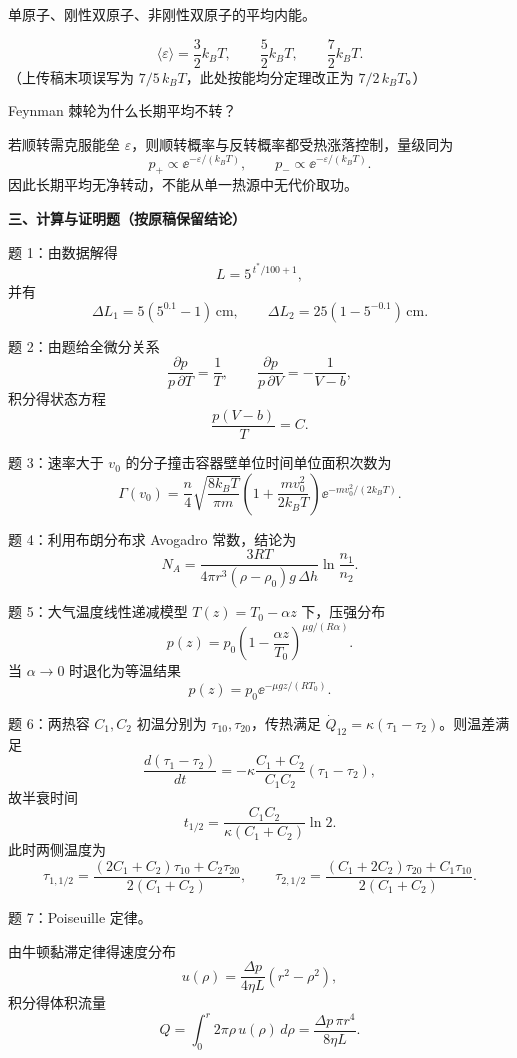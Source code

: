 \begin{question}
单原子、刚性双原子、非刚性双原子的平均内能。
\begin{solution}
\[
\langle \varepsilon\rangle=
\frac32k_BT,\qquad \frac52k_BT,\qquad \frac72k_BT.
\]
（上传稿末项误写为 $7/5\,k_BT$，此处按能均分定理改正为 $7/2\,k_BT$。）
\end{solution}
\end{question}

\begin{question}
Feynman 棘轮为什么长期平均不转？
\begin{solution}
若顺转需克服能垒 $\varepsilon$，则顺转概率与反转概率都受热涨落控制，量级同为
\[
p_+\propto \ee^{-\varepsilon/(k_BT)},
\qquad p_-\propto \ee^{-\varepsilon/(k_BT)}.
\]
因此长期平均无净转动，不能从单一热源中无代价取功。
\end{solution}
\end{question}

\textbf{三、计算与证明题（按原稿保留结论）}
\begin{question}
题 1：由数据解得
\[
L=5^{\,t^*/100+1},
\]
并有
\[
\Delta L_1=5(5^{0.1}-1)\,\mathrm{cm},
\qquad
\Delta L_2=25(1-5^{-0.1})\,\mathrm{cm}.
\]
\end{question}

\begin{question}
题 2：由题给全微分关系
\[
\frac{\partial p}{p\,\partial T}=\frac1T,
\qquad
\frac{\partial p}{p\,\partial V}=-\frac{1}{V-b},
\]
积分得状态方程
\[
\frac{p(V-b)}{T}=C.
\]
\end{question}

\begin{question}
题 3：速率大于 $v_0$ 的分子撞击容器壁单位时间单位面积次数为
\[
\Gamma(v_0)=\frac{n}{4}\sqrt{\frac{8k_BT}{\pi m}}
\left(1+\frac{mv_0^2}{2k_BT}\right)\ee^{-mv_0^2/(2k_BT)}.
\]
\end{question}

\begin{question}
题 4：利用布朗分布求 Avogadro 常数，结论为
\[
N_A=\frac{3RT}{4\pi r^3(\rho-\rho_0)g\,\Delta h}\ln\frac{n_1}{n_2}.
\]
\end{question}

\begin{question}
题 5：大气温度线性递减模型 $T(z)=T_0-\alpha z$ 下，压强分布
\[
p(z)=p_0\left(1-\frac{\alpha z}{T_0}\right)^{\mu g/(R\alpha)}.
\]
当 $\alpha\to 0$ 时退化为等温结果
\[
p(z)=p_0 \ee^{-\mu gz/(RT_0)}.
\]
\end{question}

\begin{question}
题 6：两热容 $C_1,C_2$ 初温分别为 $\tau_{10},\tau_{20}$，传热满足 $\dot Q_{12}=\kappa(\tau_1-\tau_2)$。则温差满足
\[
\frac{d(\tau_1-\tau_2)}{dt}
=-\kappa\frac{C_1+C_2}{C_1C_2}(\tau_1-\tau_2),
\]
故半衰时间
\[
t_{1/2}=\frac{C_1C_2}{\kappa(C_1+C_2)}\ln2.
\]
此时两侧温度为
\[
\tau_{1,1/2}=\frac{(2C_1+C_2)\tau_{10}+C_2\tau_{20}}{2(C_1+C_2)},
\qquad
\tau_{2,1/2}=\frac{(C_1+2C_2)\tau_{20}+C_1\tau_{10}}{2(C_1+C_2)}.
\]
\end{question}

\begin{question}
题 7：Poiseuille 定律。
\begin{solution}
由牛顿黏滞定律得速度分布
\[
u(\rho)=\frac{\Delta p}{4\eta L}(r^2-\rho^2),
\]
积分得体积流量
\[
Q=\int_0^r 2\pi\rho\,u(\rho)\,d\rho
=\frac{\Delta p\,\pi r^4}{8\eta L}.
\]
\end{solution}
\end{question}


